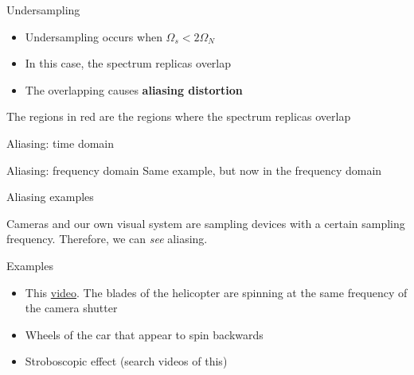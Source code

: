 \documentclass[10pt, aspectratio=169]{beamer}
\begin{document}
\begin{frame}{Undersampling}
\begin{itemize}
	\item Undersampling occurs when $\Omega_s < 2\Omega_N$
	\item In this case, the spectrum replicas overlap
	\item The overlapping causes \textbf{aliasing distortion}
\end{itemize}

\begin{center}
	\resizebox{0.9\linewidth}{!}{}
\end{center}
The regions in red are the regions where the spectrum replicas overlap
\end{frame}

\begin{frame}{Aliasing: time domain}
\begin{center}
	\resizebox{0.65\linewidth}{!}{}
\end{center}
\end{frame}

\begin{frame}{Aliasing: frequency domain}
Same example, but now in the frequency domain
\begin{center}
	\resizebox{0.75\linewidth}{!}{}
\end{center}


\end{frame}

%
\begin{frame}{Aliasing examples}

Cameras and our own visual system are sampling devices with a certain sampling frequency. Therefore, we can \textit{see} aliasing.

\begin{block}{Examples}
	\begin{itemize}
		\item This \href{https://www.youtube.com/watch?v=R-IVw8OKjvQ}{video}. 		
		The blades of the helicopter are spinning at the same frequency of the camera shutter
		\item Wheels of the car that appear to spin backwards
		\item Stroboscopic effect (search videos of this)
	\end{itemize}
\end{block}
\end{frame}
\end{document}
